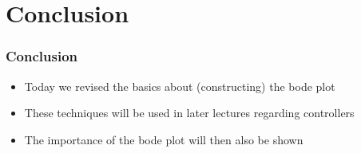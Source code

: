 \section{Conclusion}

\begin{frame}
\frametitle{Conclusion}

\begin{itemize}
\item Today we revised the basics about (constructing) the bode plot
\item These techniques will be used in later lectures regarding controllers
\item The importance of the bode plot will then also be shown
\end{itemize}

\end{frame}


